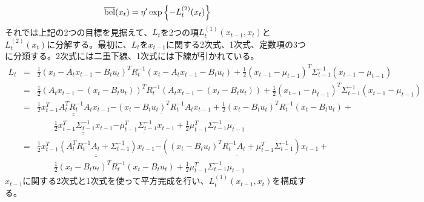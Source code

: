 \documentclass[dvipdfmx,a4paper]{jsarticle}
\begin{document}
\begin{equation}
	\operatorname{\overline{bel}}(x_t) = \eta' \exp \left\{ -L_t^{(2)}(x_t) \right\}
\end{equation}
それでは上記の2つの目標を見据えて、$L_t$を2つの項$L_t^{(1)}(x_{t - 1}, x_t)$と$L_t^{(2)}(x_t)$に分解する。最初に、$L_t$を$x_{t - 1}$に関する2次式、1次式、定数項の3つに分類する。2次式には二重下線、1次式には下線が引かれている。
\begin{eqnarray}
	L_t &=& \frac{1}{2} \left( x_t - A_t x_{t - 1} - B_t u_t \right)^T R_t^{-1} \left( x_t - A_t x_{t - 1} - B_t u_t \right) + \frac{1}{2} \left( x_{t - 1} - \mu_{t - 1} \right)^T \Sigma_{t - 1}^{-1} \left( x_{t - 1} - \mu_{t - 1} \right) \nonumber \\
	&=& \frac{1}{2} \left( A_t x_{t - 1} - \left( x_t - B_t u_t \right) \right)^T R_t^{-1} \left( A_t x_{t - 1} - \left( x_t - B_t u_t \right) \right) + \frac{1}{2} \left( x_{t - 1} - \mu_{t - 1} \right)^T \Sigma_{t - 1}^{-1} \left( x_{t - 1} - \mu_{t - 1} \right) \nonumber \\
	&=& \underline{\underline{\frac{1}{2} x_{t - 1}^T A_t^T R_t^{-1} A_t x_{t - 1}}} \underline{-\left( x_t - B_t u_t \right)^T R_t^{-1} A_t x_{t - 1}} + \frac{1}{2} \left( x_t - B_t u_t \right)^T R_t^{-1} \left( x_t - B_t u_t \right) + \nonumber \\
	&& \qquad \underline{\underline{\frac{1}{2} x_{t - 1}^T \Sigma_{t - 1}^{-1} x_{t - 1}}} \underline{-\mu_{t - 1}^T \Sigma_{t - 1}^{-1} x_{t - 1}} + \frac{1}{2} \mu_{t - 1}^T \Sigma_{t - 1}^{-1} \mu_{t - 1} \nonumber \\
	&=& \underline{\underline{\frac{1}{2} x_{t - 1}^T \left( A_t^T R_t^{-1} A_t + \Sigma_{t - 1}^{-1} \right) x_{t - 1}}} \underline{-\left( \left( x_t - B_t u_t \right)^T R_t^{-1} A_t + \mu_{t - 1}^T \Sigma_{t - 1}^{-1} \right) x_{t - 1}} + \nonumber \\
	&& \qquad \frac{1}{2} \left( x_t - B_t u_t \right)^T R_t^{-1} \left( x_t - B_t u_t \right) + \frac{1}{2} \mu_{t - 1}^T \Sigma_{t - 1}^{-1} \mu_{t - 1}
\end{eqnarray}
$x_{t - 1}$に関する2次式と1次式を使って平方完成を行い、$L_t^{(1)}(x_{t - 1}, x_t)$を構成する。
\end{document}
